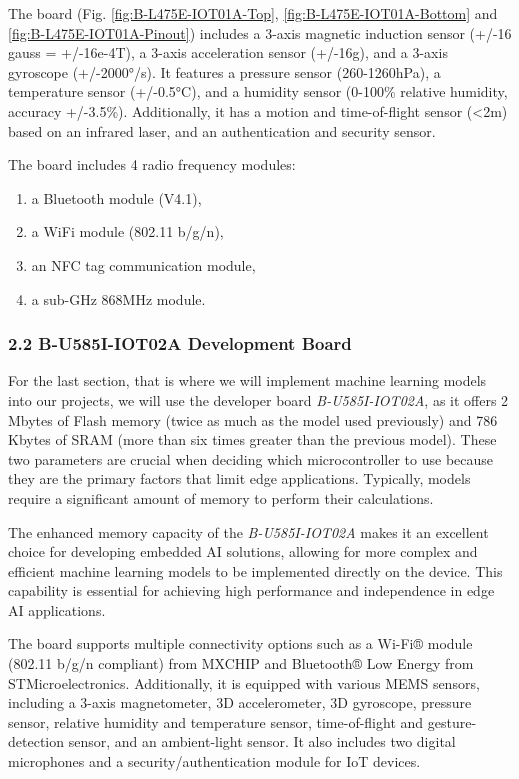 \documentclass[10pt,a4paper,onecolumn]{article}
\begin{document}
The board (Fig. \ref{fig:B-L475E-IOT01A-Top}, \ref{fig:B-L475E-IOT01A-Bottom} and \ref{fig:B-L475E-IOT01A-Pinout}) includes a 3-axis magnetic induction sensor (+/-16 gauss = +/-16e-4T), a 3-axis acceleration sensor (+/-16g), and a 3-axis gyroscope (+/-2000°/s). It features a pressure sensor (260-1260hPa), a temperature sensor (+/-0.5°C), and a humidity sensor (0-100\% relative humidity, accuracy +/-3.5\%). Additionally, it has a motion and time-of-flight sensor (<2m) based on an infrared laser, and an authentication and security sensor.

The board includes 4 radio frequency modules:

\begin{enumerate}
 \item a Bluetooth module (V4.1), 
 \item a WiFi module (802.11 b/g/n),
 \item an NFC tag communication module,
 \item a sub-GHz 868MHz module.
\end{enumerate}

\hypertarget{b-u585i-iot02a-development-board}{%
\subsubsection{2.2 B-U585I-IOT02A Development
Board}\label{b-u585i-iot02a-development-board}}

For the last section, that is where we will implement machine learning models into our projects, we will use the developer board \textit{B-U585I-IOT02A}, as it offers 2 Mbytes of Flash memory (twice as much as the model used previously) and 786 Kbytes of SRAM (more than six times greater than the previous model). These two parameters are crucial when deciding which microcontroller to use because they are the primary factors that limit edge applications. Typically, models require a significant amount of memory to perform their calculations.

The enhanced memory capacity of the \textit{B-U585I-IOT02A} makes it an excellent choice for developing embedded AI solutions, allowing for more complex and efficient machine learning models to be implemented directly on the device. This capability is essential for achieving high performance and independence in edge AI applications.

The board supports multiple connectivity options such as a Wi-Fi® module (802.11 b/g/n compliant) from MXCHIP and Bluetooth® Low Energy from STMicroelectronics. Additionally, it is equipped with various MEMS sensors, including a 3-axis magnetometer, 3D accelerometer, 3D gyroscope, pressure sensor, relative humidity and temperature sensor, time-of-flight and gesture-detection sensor, and an ambient-light sensor. It also includes two digital microphones and a security/authentication module for IoT devices.
\end{document}
